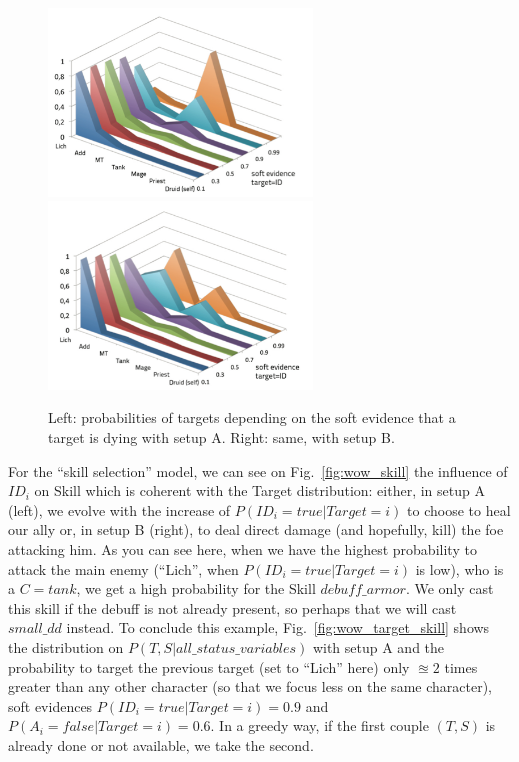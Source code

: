 \begin{figure}[h!]
\begin{center}
\includegraphics[width=7cm]{images/wow_distrib_target1.png} \includegraphics[width=7cm]{images/wow_distrib_target2.png}
\caption{Left: probabilities of targets depending on the soft evidence that a target is dying with setup A. Right: same, with setup B.}
\label{fig:wow_target}
\end{center}
\end{figure}

For the ``skill selection'' model, we can see on Fig.~\ref{fig:wow_skill} the influence of $ID_i$ on Skill which is coherent with the Target distribution: either, in setup A (left), we evolve with the increase of $P(ID_i=true|Target=i)$ to choose to heal our ally or, in setup B (right), to deal direct damage (and hopefully, kill) the foe attacking him. As you can see here, when we have the highest probability to attack the main enemy (``Lich'', when $P(ID_i=true|Target=i)$ is low), who is a $C=tank$, we get a high probability for the Skill $debuff\_armor$. We only cast this skill if the debuff is not already present, so perhaps that we will cast $small\_dd$ instead. To conclude this example, Fig.~\ref{fig:wow_target_skill} shows the distribution on $P(T,S|all\_status\_variables)$ with setup A and the probability to target the previous target (set to ``Lich'' here) only $\approxeq 2$ times greater than any other character (so that we focus less on the same character), soft evidences $P(ID_i=true|Target=i)=0.9$ and $P(A_i=false|Target=i)=0.6$. In a greedy way, if the first couple $(T,S)$ is already done or not available, we take the second.

